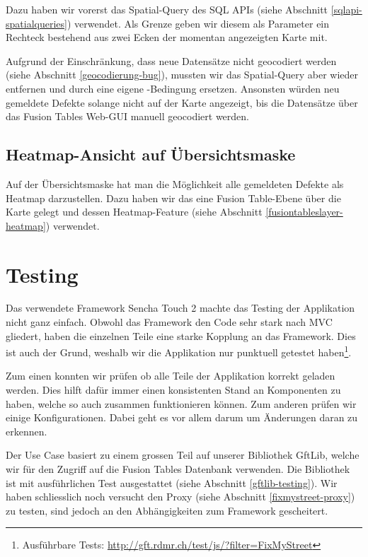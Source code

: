 Dazu haben wir vorerst das Spatial-Query  des SQL \gls{API}s (siehe Abschnitt \ref{sqlapi-spatialqueries}) verwendet. Als Grenze geben wir diesem als Parameter ein Rechteck bestehend aus zwei Ecken der momentan angezeigten Karte mit.

Aufgrund der Einschränkung, dass neue Datensätze nicht geocodiert werden (siehe Abschnitt \ref{geocodierung-bug}), mussten wir das Spatial-Query aber wieder entfernen und durch eine eigene -Bedingung ersetzen. Ansonsten würden neu gemeldete Defekte solange nicht auf der Karte angezeigt, bis die Datensätze über das Fusion Tables Web-GUI manuell geocodiert werden.

\subsection{Heatmap-Ansicht auf Übersichtsmaske}
\label{fixmystreet-heatmap}
Auf der Übersichtsmaske hat man die Möglichkeit alle gemeldeten Defekte als Heatmap darzustellen. Dazu haben wir das eine Fusion Table-Ebene über die Karte gelegt und dessen Heatmap-Feature (siehe Abschnitt \ref{fusiontableslayer-heatmap}) verwendet. 

\section{Testing}
Das verwendete Framework Sencha Touch 2 machte das Testing der Applikation nicht ganz einfach. Obwohl das Framework den Code sehr stark nach \gls{MVC} gliedert, haben die einzelnen Teile eine starke Kopplung an das Framework. Dies ist auch der Grund, weshalb wir die Applikation nur punktuell getestet haben\footnote{Ausführbare Tests: \url{http://gft.rdmr.ch/test/js/?filter=FixMyStreet}}.

Zum einen konnten wir prüfen ob alle Teile der Applikation korrekt geladen werden. Dies hilft dafür immer einen konsistenten Stand an Komponenten zu haben, welche so auch zusammen funktionieren können. Zum anderen prüfen wir einige Konfigurationen. Dabei geht es vor allem darum um Änderungen daran zu erkennen.

Der Use Case basiert zu einem grossen Teil auf unserer Bibliothek GftLib, welche wir für den Zugriff auf die Fusion Tables Datenbank verwenden. Die Bibliothek ist mit ausführlichen Test ausgestattet (siehe Abschnitt \ref{gftlib-testing}). Wir haben schliesslich noch versucht den Proxy (siehe Abschnitt \ref{fixmystreet-proxy}) zu testen, sind jedoch an den Abhängigkeiten zum Framework gescheitert.

